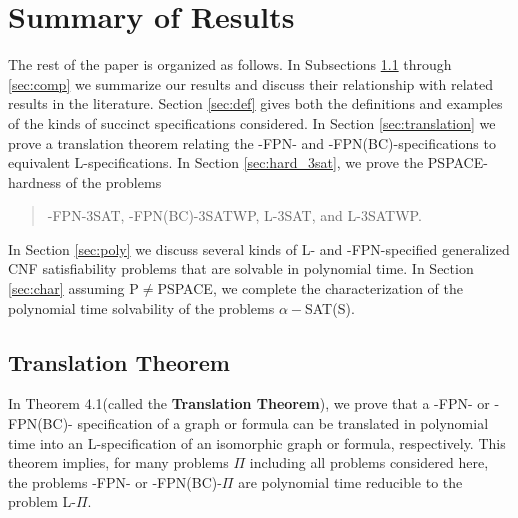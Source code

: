 \section{Summary of Results}
\label{sec:summary}

The rest of the paper is organized as follows.  In Subsections 
\ref{sec:trans} through \ref{sec:comp} 
we summarize our  results and discuss their relationship with related 
results in the literature. Section \ref{sec:def} gives both the 
definitions and examples of the kinds of  succinct 
specifications considered.
In Section \ref{sec:translation}
we  prove a translation theorem  relating the 
{-FPN-} and {-FPN(BC)-}specifications 
to equivalent {\sf L-}specifications. 
 In Section \ref{sec:hard_3sat},
we prove the {\sf PSPACE}-hardness of the problems
\begin{quote}
 {-FPN-3SAT}, {-FPN(BC)-3SATWP},  {\sf L-3SAT}, and
{\sf L-3SATWP}.
\end{quote}
In Section \ref{sec:poly} we discuss several kinds of  
{\sf L-} and {-FPN-}specified generalized {\sf CNF} 
 satisfiability problems that are solvable in 
polynomial time. In Section \ref{sec:char} assuming 
{\sf P}$\neq${\sf PSPACE}, we complete the 
characterization of the polynomial time solvability
of the problems $\alpha-${\sf SAT(S)}. 

 
\vspace*{-0.15in}
\subsection{Translation Theorem}\label{sec:trans}
In Theorem 4.1(called the {\bf Translation Theorem}),
we prove that a {-FPN-} or {-FPN(BC)-} specification of a graph
or  formula can be translated in polynomial time into an
{\sf L}-specification of an isomorphic  graph or formula, respectively.
This theorem implies, for many problems
$\Pi$ including all problems considered here,  the problems 
{-FPN-} or {-FPN(BC)-}$\Pi$ are 
polynomial time reducible to  the problem {\sf L-}$\Pi$.


